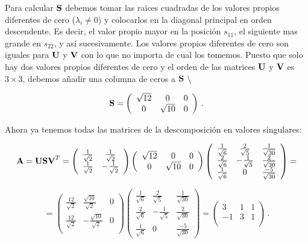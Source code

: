 \documentclass[
]{agujournal2019}
\begin{document}
Para calcular \({\textbf S}\) debemos tomar las raices cuadradas de los
valores propios diferentes de cero (\(\lambda_i\ne0\)) y colocarlos en
la diagonal principal en orden descendente. Es decir, el valor propio
mayor en la posición \(s_{11}\), el siguiente mas grande en \(s_{22}\),
y así sucesivamente. Los valores propios diferentes de cero son iguales
para \({\textbf U}\) y \({\textbf V}\) con lo que no importa de cual los
tomemos. Puesto que solo hay dos valores propios diferentes de cero y el
orden de las matrices \({\textbf U}\) y \({\textbf V}\) es \(3\times3\),
debemos añadir una columna de ceros a \({\textbf S}\) \textbackslash{}

\[{\textbf S}=\left(\begin{array}{ccc}
  \sqrt{12} & 0 & 0 \\
  0 & \sqrt{10} & 0\\
      \end{array}\right)\,.\]

Ahora ya tenemos todas las matrices de la descomposición en valores
singulares:

\[{\textbf A}={\textbf U}{\textbf S}{\textbf V}^T=\left(\begin{array}{cc}
  \frac{1}{\sqrt{2}} & \frac{1}{\sqrt{2}} \\
  \frac{1}{\sqrt{2}} & -\frac{1}{\sqrt{2}} \\
      \end{array}\right)
      \left(\begin{array}{ccc}
  \sqrt{12} & 0 & 0 \\
  0 & \sqrt{10} & 0\\
      \end{array}\right)
      \left(\begin{array}{ccc}
  \frac{1}{\sqrt{6}} & \frac{2}{\sqrt{5}} & \frac{1}{\sqrt{30}}\\
  \frac{2}{\sqrt{6}} & -\frac{1}{\sqrt{5}} & \frac{2}{\sqrt{30}}\\
  \frac{1}{\sqrt{6}} & 0 & \frac{-5}{\sqrt{30}}
      \end{array}\right)=\]

\[=\left(\begin{array}{ccc}
  \frac{12}{\sqrt{2}} & \frac{\sqrt{10}}{\sqrt{2}} & 0\\
  \frac{12}{\sqrt{2}} & -\frac{\sqrt{10}}{\sqrt{2}} & 0\\
      \end{array}\right)
      \left(\begin{array}{ccc}
  \frac{1}{\sqrt{6}} & \frac{2}{\sqrt{5}} & \frac{1}{\sqrt{30}}\\
  \frac{2}{\sqrt{6}} & -\frac{1}{\sqrt{5}} & \frac{2}{\sqrt{30}}\\
  \frac{1}{\sqrt{6}} & 0 & \frac{-5}{\sqrt{30}}
      \end{array}\right)=
      \left(\begin{array}{ccc}
  3 & 1 & 1 \\
  -1 & 3 & 1\\
      \end{array}\right)\,.\]
\end{document}
